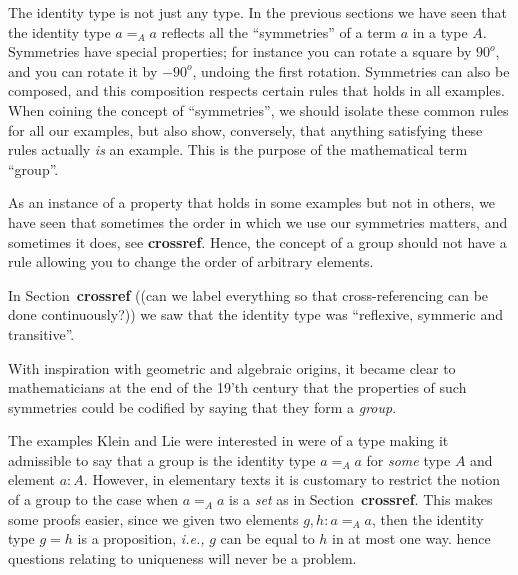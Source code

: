 \newcommand{\ie}{{\em i.e., }}%
\newcommand{\refer}{{\bf crossref}}%
The identity type is not just any type.  In the previous sections we have seen that the identity type $a=_Aa$ reflects all the ``symmetries'' of a term $a$ in a type $A$.  Symmetries have special properties; for instance you can rotate a square by $90^o$, and you can rotate it by $-90^o$, undoing the first rotation.  
Symmetries can also be composed, and this composition respects certain rules that holds in all examples.  When coining the concept of ``symmetries'', we should isolate these common rules for all our examples, but also show, conversely, that anything satisfying these rules actually {\em is} an example.  This is the purpose of the mathematical term ``group''. 

As an instance of a property that holds in some examples but not in others, we have seen that sometimes the order in which we use our symmetries matters, and sometimes it does, see \refer{}.  Hence, the concept of a group should not have a rule allowing you to change the order of arbitrary elements.

In Section~\refer{} ((can we label everything so that cross-referencing can be done continuously?)) we saw that the identity type was ``reflexive, symmeric and transitive''.  

With inspiration with geometric and algebraic origins, it became clear to mathematicians at the end of the 19'th century that the properties of such symmetries could be codified by saying that they form a {\em group}. 

The examples Klein and Lie were interested in were of a type making it admissible to say that a group is the identity type $a=_Aa$ for {\em some} type $A$ and element $a:A$.  
However, in elementary texts it is customary to restrict the notion of a group to the case when $a=_Aa$ is a {\em set} as in Section~\refer{}.  This makes some proofs easier, since we given two elements $g,h:a=_Aa$, then the identity type $g=h$ is a proposition, \ie $g$ can be equal to $h$ in at most one way.  hence questions relating to uniqueness will never be a problem.


